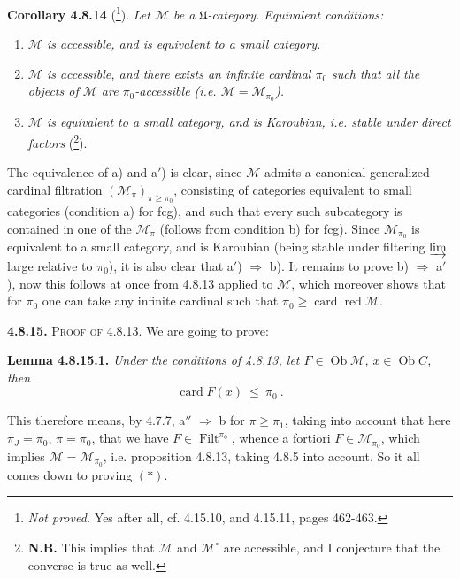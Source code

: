 \documentclass[11pt]{article}
\newcommand{\printedpage}[1]{\marginpar{\footnotesize p.~#1}}
\newcommand{\msp}[1]{\marginpar{\footnotesize [#1]}}
\newcommand{\Filt}{\operatorname{Filt}}
\newcommand{\card}{\operatorname{card}}
\newcommand{\red}{\operatorname{\text{red}}}
\newcommand{\Ob}{\operatorname{Ob}}
\newcommand{\cM}{\mathcal{M}}
\begin{document}
\textbf{Corollary 4.8.14} (\footnote[90]{\textit{Not proved.} Yes after all, cf. 4.15.10, and 4.15.11, pages 462-463.}). \textit{Let $\cM$ be a $\mathfrak{U}$-category. Equivalent conditions:}
\begin{enumerate}[leftmargin=*]
\item[\textit{a)}] \textit{$\cM$ is accessible, and is equivalent to a small category.}
\item[\textit{a$'$)}] \textit{$\cM$ is accessible, and there exists an infinite cardinal $\pi_0$ such that all the objects of $\cM$ are $\pi_0$-accessible (i.e. $\cM = \cM_{\pi_0}$).}
\item[\textit{b)}] \textit{$\cM$ is equivalent to a small category, and is Karoubian, i.e. stable under direct factors} (\footnote[91]{\textbf{N.B.} This implies that $\cM$ and $\cM^{\circ}$ are accessible, and I conjecture that the converse is true as well.}). %
\end{enumerate}

The equivalence of a) and a$'$) is clear, since $\cM$ admits a canonical generalized cardinal filtration $(\cM_{\pi})_{\pi\geqslant\pi_0}$, consisting of categories equivalent to small categories (condition
\printedpage{76}
a) for fcg), and such that every such subcategory is contained in one of the $\cM_{\pi}$ (follows from condition b) for fcg). Since $\cM_{\pi_0}$ is equivalent to a small category, and is Karoubian (being stable under filtering $\varinjlim$ large relative to $\pi_0$), it is also clear that a$'$) $\Longrightarrow$ b). It remains to prove b) $\Longrightarrow$ a$'$), now this follows at once from 4.8.13 applied to $\cM$, which moreover shows that for $\pi_0$ one can take any infinite cardinal such that $\pi_0 \geqslant \card\red\cM$.

\msp{page 214}

\textbf{4.8.15.} \textsc{Proof of} 4.8.13. We are going to prove:

\textbf{Lemma 4.8.15.1.} \textit{Under the conditions of 4.8.13, let $F \in \Ob\cM$, $x \in \Ob C$, then}
\[
\card F(x) \ \leqslant\ \pi_0\ . \tag*{$(*)$}
\]

This therefore means, by 4.7.7, a$''$ $\Longrightarrow$ b for $\pi \geqslant \pi_1$, taking into account that here $\pi_J = \pi_0$, $\pi = \pi_0$, that we have $F \in \Filt^{\pi_0}$, whence a fortiori $F \in \cM_{\pi_0}$, which implies $\cM = \cM_{\pi_0}$, i.e. proposition 4.8.13, taking 4.8.5 into account. So it all comes down to proving $(*)$.
\end{document}
